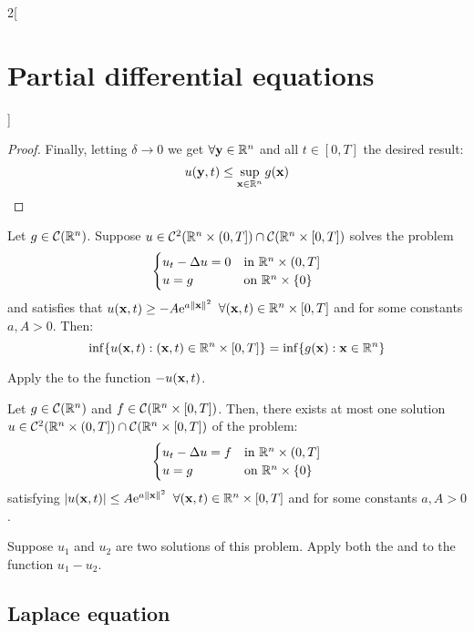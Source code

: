 \documentclass[../../../main_math.tex]{subfiles}
\begin{document}
\begin{multicols}{2}[\section{Partial differential equations}]
\begin{proof}
    Finally, letting $\delta\to 0$ we get $\forall\boldsymbol{\mathrm{y}}\in\mathbb{R}^n$ and all $t\in[0,T]$ the desired result: $$u(\boldsymbol{\mathrm{y}},t)\leq \sup_{\boldsymbol{\mathrm{x}}\in\mathbb{R}^n} g(\boldsymbol{\mathrm{x}})$$
  \end{proof}
  \begin{theorem}\label{PDE:minunbounded}
    Let $g\in\mathcal{C}(\mathbb{R}^n)$. Suppose $u\in\mathcal{C}^2(\mathbb{R}^n\times (0,T])\cap\mathcal{C}(\mathbb{R}^n\times [0,T])$ solves the problem
    $$
      \begin{cases}
        u_{t}  -\Delta{u} = 0 & \text{in $\mathbb{R}^n\times (0,T]$} \\
        u=g                       & \text{on $\mathbb{R}^n\times \{0\}$}
      \end{cases}
    $$ and satisfies that $u(\boldsymbol{\mathrm{x}},t)\geq -A\mathrm{e}^{a\left\|\boldsymbol{\mathrm{x}}\right\|^2}$ $\forall (\boldsymbol{\mathrm{x}},t)\in\mathbb{R}^n\times [0,T]$ and for some constants $a, A> 0$. Then:
    $$\displaystyle\inf\{u(\boldsymbol{\mathrm{x}},t):(\boldsymbol{\mathrm{x}},t)\in\mathbb{R}^n\times[0,T]\}=\inf\{g(\boldsymbol{\mathrm{x}}):\boldsymbol{\mathrm{x}}\in\mathbb{R}^n\}$$
  \end{theorem}
  \begin{sproof}
    Apply the  to the function $-u(\boldsymbol{\mathrm{x}},t)$.
  \end{sproof}
  \begin{theorem}
    Let $g\in\mathcal{C}(\mathbb{R}^n)$ and $f\in\mathcal{C}(\mathbb{R}^n\times [0,T])$. Then, there exists at most one solution $u\in\mathcal{C}^2(\mathbb{R}^n\times (0,T])\cap\mathcal{C}(\mathbb{R}^n\times [0,T])$ of the problem:
    $$
      \begin{cases}
        u_{t}  -\Delta{u} = f & \text{in $\mathbb{R}^n\times (0,T]$} \\
        u=g                       & \text{on $\mathbb{R}^n\times \{0\}$}
      \end{cases}
    $$
    satisfying $\abs{u(\boldsymbol{\mathrm{x}},t)}\leq A\mathrm{e}^{a\left\|\boldsymbol{\mathrm{x}}\right\|^2}$ $\forall (\boldsymbol{\mathrm{x}},t)\in\mathbb{R}^n\times [0,T]$ and for some constants $a, A>0$.
  \end{theorem}
  \begin{sproof}
    Suppose $u_1$ and $u_2$ are two solutions of this problem. Apply both the  and  to the function $u_1-u_2$.
  \end{sproof}
  \subsection{Laplace equation}

\end{multicols}
\end{document}
